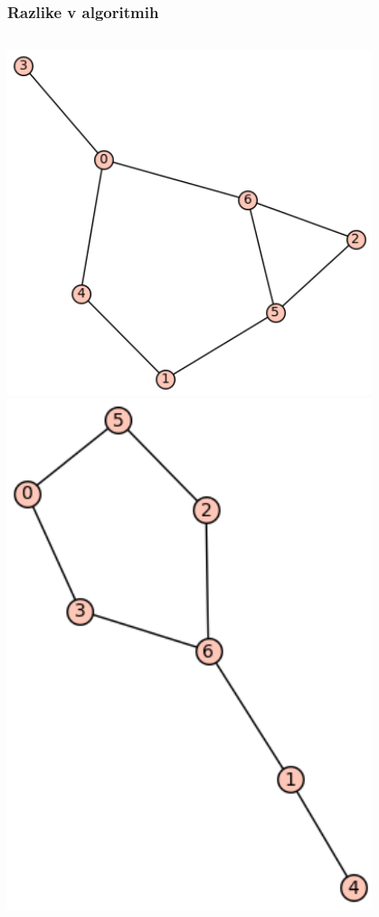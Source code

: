 \documentclass[12pt, hyperref={unicode}]{beamer}
\begin{document}
\begin{frame}
  
  \frametitle{Razlike v algoritmih}
  \begin{columns}
    \includegraphics[width=0.8\textwidth]{ciklj_in_d.png}
    \includegraphics[width=0.8\textwidth]{d_in_cikelj.png}
  \end{columns}
  
\end{frame}
\end{document}
